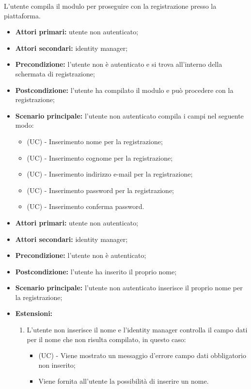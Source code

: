 L'utente compila il modulo per proseguire con la registrazione presso la piattaforma.
\begin{itemize}
	\item \textbf{Attori primari:} utente non autenticato;
	\item \textbf{Attori secondari:} identity manager;
	\item \textbf{Precondizione:} l'utente non è autenticato e si trova all'interno della schermata di registrazione;
	\item \textbf{Postcondizione:} l'utente ha compilato il modulo e può procedere con la registrazione;
	\item \textbf{Scenario principale:} l'utente non autenticato compila i campi nel seguente modo:
	\begin{itemize}
		\item (UC) - Inserimento nome per la registrazione;
		\item (UC) - Inserimento cognome per la registrazione;
		\item (UC) - Inserimento indirizzo e-mail per la registrazione;
		\item (UC) - Inserimento password per la registrazione;
		\item (UC) - Inserimento conferma password.
	\end{itemize}
\end{itemize}

\begin{itemize}
	\item \textbf{Attori primari:} utente non autenticato;
	\item \textbf{Attori secondari:} identity manager;
	\item \textbf{Precondizione:} l'utente non è autenticato;
	\item \textbf{Postcondizione:} l'utente ha inserito il proprio nome;
	\item \textbf{Scenario principale:} l'utente non autenticato inserisce il proprio nome per la registrazione;
	\item \textbf{Estensioni:}
	\begin{enumerate}[label=\lett]
		\item L'utente non inserisce il nome e l'identity manager controlla il campo dati per il nome che non risulta compilato, in questo caso:
		\begin{itemize}
			\item (UC) - Viene mostrato un messaggio d'errore campo dati obbligatorio non inserito;
			\item Viene fornita all'utente la possibilità di inserire un nome.
		\end{itemize}
	\end{enumerate} 
\end{itemize}

